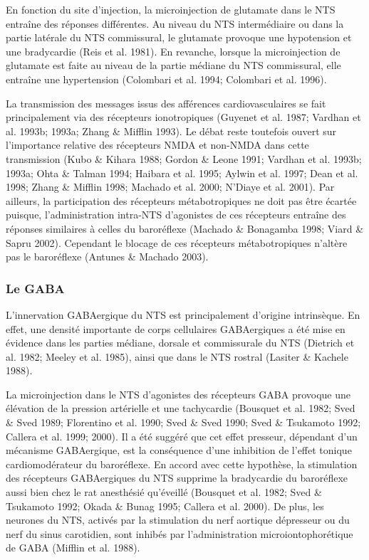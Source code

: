 \documentclass[a4paper,12pt,twoside]{report}
\begin{document}
En fonction du site d’injection, la microinjection de glutamate dans le NTS entraîne des réponses différentes. Au niveau du NTS intermédiaire ou dans la partie latérale du NTS commissural, le glutamate provoque une hypotension et une bradycardie (Reis et al. 1981). En revanche, lorsque la microinjection de glutamate est faite au niveau de la partie médiane du NTS commissural, elle entraîne une hypertension (Colombari et al. 1994; Colombari et al. 1996).

La transmission des messages issus des afférences cardiovasculaires se fait principalement via des récepteurs ionotropiques (Guyenet et al. 1987; Vardhan et al. 1993b; 1993a; Zhang \& Mifflin 1993). Le débat reste toutefois ouvert sur l’importance relative des récepteurs NMDA et non-NMDA dans cette transmission (Kubo \& Kihara 1988; Gordon \& Leone 1991; Vardhan et al. 1993b; 1993a; Ohta \& Talman 1994; Haibara et al. 1995; Aylwin et al. 1997; Dean et al. 1998; Zhang \& Mifflin 1998; Machado et al. 2000; N'Diaye et al. 2001). Par ailleurs, la participation des récepteurs métabotropiques ne doit pas être écartée puisque, l’administration intra-NTS d’agonistes de ces récepteurs entraîne des réponses similaires à celles du baroréflexe (Machado \& Bonagamba 1998; Viard \& Sapru 2002). Cependant le blocage de ces récepteurs métabotropiques n’altère pas le baroréflexe (Antunes \& Machado 2003). 

\subsubsection{Le GABA}

L’innervation GABAergique du NTS est principalement d’origine intrinsèque. En effet, une densité importante de corps cellulaires GABAergiques a été mise en évidence dans les parties médiane, dorsale et commissurale du NTS (Dietrich et al. 1982; Meeley et al. 1985), ainsi que dans le NTS rostral (Lasiter \& Kachele 1988). 

La microinjection dans le NTS d’agonistes des récepteurs GABA provoque une élévation de la pression artérielle et une tachycardie (Bousquet et al. 1982; Sved \& Sved 1989; Florentino et al. 1990; Sved \& Sved 1990; Sved \& Tsukamoto 1992; Callera et al. 1999; 2000). Il a été suggéré que cet effet presseur, dépendant d’un mécanisme GABAergique, est la conséquence d’une inhibition de l’effet tonique cardiomodérateur du baroréflexe. En accord avec cette hypothèse, la stimulation des récepteurs GABAergiques du NTS supprime la bradycardie du baroréflexe aussi bien chez le rat anesthésié qu’éveillé (Bousquet et al. 1982; Sved \& Tsukamoto 1992; Okada \& Bunag 1995; Callera et al. 2000). De plus, les neurones du NTS, activés par la stimulation du nerf aortique dépresseur ou du nerf du sinus carotidien, sont inhibés par l’administration microiontophorétique de GABA (Mifflin et al. 1988). 
\end{document}
